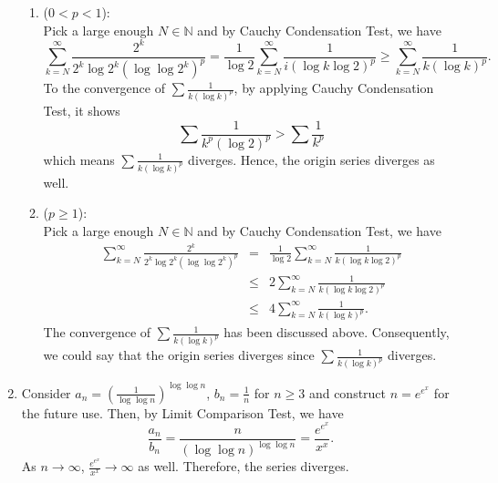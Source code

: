 \documentclass[a4paper]{article}
\newcommand{\N}{\mathbb{N}}
\theoremstyle{plain}
\begin{document}
\begin{enumerate}[label = (\alph*)]
\begin{enumerate}
            \item ($0<p<1$): \\
                Pick a large enough $N \in \N$ and by Cauchy Condensation Test, we have
                \[
                    \sum^\infty_{k=N}\frac{2^k}{2^k\log 2^k(\log\log 2^k)^p}
                    = \frac{1}{\log 2}\sum^\infty_{k=N}\frac{1}{i(\log k \log 2)^p}
                    \geq \sum^\infty_{k=N}\frac{1}{k(\log k)^p}.
                \]
                To the convergence of $\sum\frac{1}{k(\log k)^p}$, by applying Cauchy Condensation Test,
                it shows
                \[
                    \sum\frac{1}{k^p(\log 2)^p} > \sum\frac{1}{k^p}
                \]
                which means $\sum\frac{1}{k(\log k)^p}$ diverges. Hence, the origin series diverges
                as well.

            \item ($p \geq 1$): \\
                Pick a large enough $N \in \N$ and by Cauchy Condensation Test, we have
                \[
                    \begin{array}{RCL}
                        \sum^\infty_{k=N}\frac{2^k}{2^k\log 2^k(\log\log 2^k)^p} 
                        & = & \frac{1}{\log 2}\sum^\infty_{k=N}\frac{1}{k(\log k \log 2)^p} \\
                        & \leq & 2\sum^\infty_{k=N}\frac{1}{k(\log k \log 2)^p} \\
                        & \leq & 4\sum^\infty_{k=N}\frac{1}{k(\log k)^p}.
                    \end{array}
                \]
                The convergence of $\sum\frac{1}{k(\log k)^p}$ has been discussed above.
                Consequently, we could say that the origin series diverges since
                $\sum\frac{1}{k(\log k)^p}$ diverges.

        \end{enumerate}

    \item Consider $a_n = \left(\frac{1}{\log\log n}\right)^{\log\log n}$, 
        $b_n = \frac{1}{n}$ for $n\geq 3$ and construct $n = e^{e^x}$ for the future use. Then,
        by Limit Comparison Test, we have
        \[
            \frac{a_n}{b_n} = \frac{n}{\left(\log\log n\right)^{\log\log n}} = \frac{e^{e^x}}{x^x}.
        \]
        As $n\to\infty$, $\frac{e^{e^x}}{x^x} \to \infty$ as well. Therefore, the series diverges.
\end{enumerate}
\end{document}
